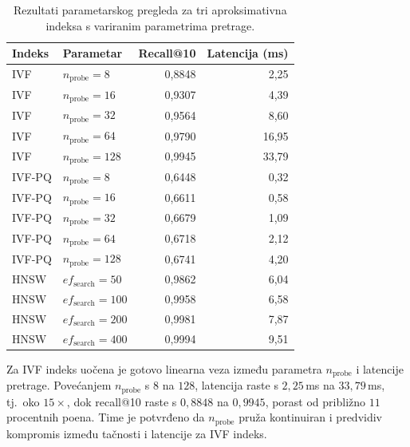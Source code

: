 \begin{table}[htbp]
	\centering
	\caption{Rezultati parametarskog pregleda za tri
		aproksimativna indeksa s variranim
		parametrima pretrage.}
	\label{tab:sweep_rezultati}
	\begin{tabular}{llrr}
		\hline
		\textbf{Indeks}              &
		\textbf{Parametar}           &
		\textbf{Recall@10}           &
		\textbf{Latencija (ms)}                           \\
		\hline
		IVF                          &
		$n_{\mathrm{probe}} = 8$     & 0{,}8848 & 2{,}25  \\
		IVF                          &
		$n_{\mathrm{probe}} = 16$    & 0{,}9307 & 4{,}39  \\
		IVF                          &
		$n_{\mathrm{probe}} = 32$    & 0{,}9564 & 8{,}60  \\
		IVF                          &
		$n_{\mathrm{probe}} = 64$    & 0{,}9790 & 16{,}95 \\
		IVF                          &
		$n_{\mathrm{probe}} = 128$   & 0{,}9945 & 33{,}79 \\
		\hline
		IVF-PQ                       &
		$n_{\mathrm{probe}} = 8$     & 0{,}6448 & 0{,}32  \\
		IVF-PQ                       &
		$n_{\mathrm{probe}} = 16$    & 0{,}6611 & 0{,}58  \\
		IVF-PQ                       &
		$n_{\mathrm{probe}} = 32$    & 0{,}6679 & 1{,}09  \\
		IVF-PQ                       &
		$n_{\mathrm{probe}} = 64$    & 0{,}6718 & 2{,}12  \\
		IVF-PQ                       &
		$n_{\mathrm{probe}} = 128$   & 0{,}6741 & 4{,}20  \\
		\hline
		HNSW                         &
		$ef_{\mathrm{search}} = 50$  & 0{,}9862 & 6{,}04  \\
		HNSW                         &
		$ef_{\mathrm{search}} = 100$ & 0{,}9958 & 6{,}58  \\
		HNSW                         &
		$ef_{\mathrm{search}} = 200$ & 0{,}9981 & 7{,}87  \\
		HNSW                         &
		$ef_{\mathrm{search}} = 400$ & 0{,}9994 & 9{,}51  \\
		\hline
	\end{tabular}
\end{table}

Za \foreignlanguage{english}{IVF} indeks uočena je
gotovo linearna veza između parametra
$n_{\mathrm{probe}}$ i latencije pretrage.
Povećanjem $n_{\mathrm{probe}}$ s $8$ na $128$,
latencija raste s $2{,}25$\,ms na $33{,}79$\,ms,
tj.\ oko $15\times$, dok \foreignlanguage{english}%
{recall@10} raste s $0{,}8848$ na $0{,}9945$,
porast od približno $11$ procentnih poena.
Time je potvrđeno da $n_{\mathrm{probe}}$ pruža
kontinuiran i predvidiv kompromis između tačnosti
i latencije za \foreignlanguage{english}{IVF}
indeks.

